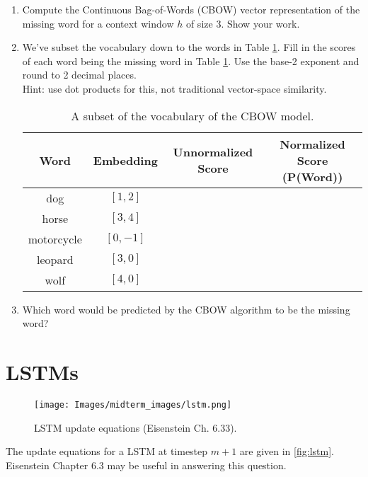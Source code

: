 \documentclass[12pt, letterpaper]{article}
\begin{document}
\begin{enumerate}
    \item Compute the Continuous Bag-of-Words (CBOW) vector representation of the missing word for a context window $h$ of size 3. Show your work.

    \item We've subset the vocabulary down to the words in Table \ref{tab:vocab}. Fill in the scores of each word being the missing word in Table \ref{tab:vocab}. Use the base-2 exponent and round to 2 decimal places.\\
    Hint: use dot products for this, not traditional vector-space similarity.
    
\begin{table}[h!]
    \centering
    \begin{tabular}{|c|c|c|c|}
    \toprule
    \textbf{Word} & \textbf{Embedding} & \textbf{Unnormalized Score} & \textbf{Normalized Score (P(Word))}\\
    \midrule
    dog & $[1,2]$ & & \\
    \hline
    horse & $[3,4]$ & & \\
    \hline
    motorcycle & $[0,-1]$ & & \\
    \hline
    leopard & $[3,0]$ & & \\
    \hline
    wolf & $[4,0]$ & & \\
    \bottomrule
    \end{tabular}
    \label{tab:vocab}
    \caption{A subset of the vocabulary of the CBOW model.}
\end{table}
    
    \item Which word would be predicted by the CBOW algorithm to be the missing word?
    
\end{enumerate}

\section{LSTMs}

\begin{figure}[h!]
    \centering
    \texttt{[image: Images/midterm\_images/lstm.png]}
    \caption{LSTM update equations (Eisenstein Ch. 6.33).}
    \label{fig:lstm}
\end{figure}

The update equations for a LSTM at timestep $m+1$ are given in \autoref{fig:lstm}. Eisenstein Chapter 6.3 may be useful in answering this question. 
\end{document}
